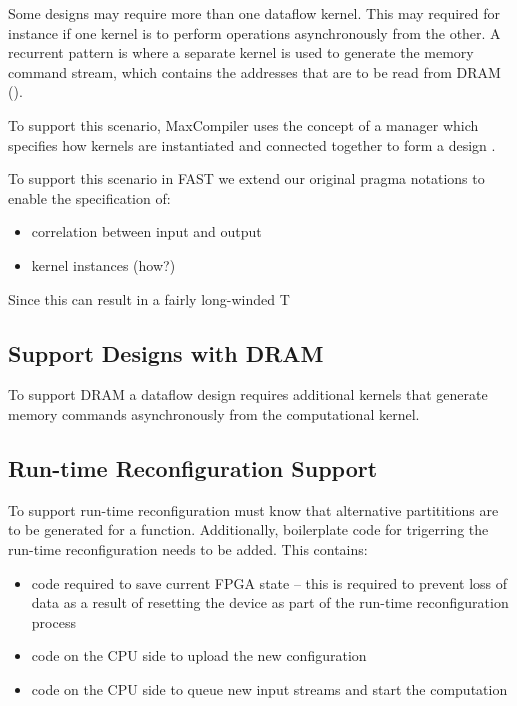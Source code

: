 Some designs may require more than one dataflow kernel. This may
required for instance if one kernel is to perform operations
asynchronously from the other. A recurrent pattern is where a separate
kernel is used to generate the memory command stream, which contains
the addresses that are to be read from DRAM ().

To support this scenario, MaxCompiler uses the concept of a manager
which specifies how kernels are instantiated and connected together to
form a design .

To support this scenario in FAST we extend our original pragma
notations to enable the specification of:
\begin{itemize}
  \item correlation between input and output
  \item kernel instances (how?)
\end{itemize}

Since this can result in a fairly long-winded
T

\subsection{Support Designs with DRAM}
\label{sec:fast-dram}

To support DRAM a dataflow design requires additional kernels that
generate memory commands asynchronously from the computational kernel.


\subsection{Run-time Reconfiguration Support}


To support run-time reconfiguration \fastc{} must know that
alternative partititions are to be generated for a function.
Additionally, boilerplate code for trigerring the run-time
reconfiguration needs to be added. This contains:
\begin{itemize}
\item code required to save current FPGA state -- this is required to
  prevent loss of data as a result of resetting the device as part of
  the run-time reconfiguration process
\item code on the CPU side to upload the new configuration
\item code on the CPU side to queue new input streams and start the
  computation
\end{itemize}



